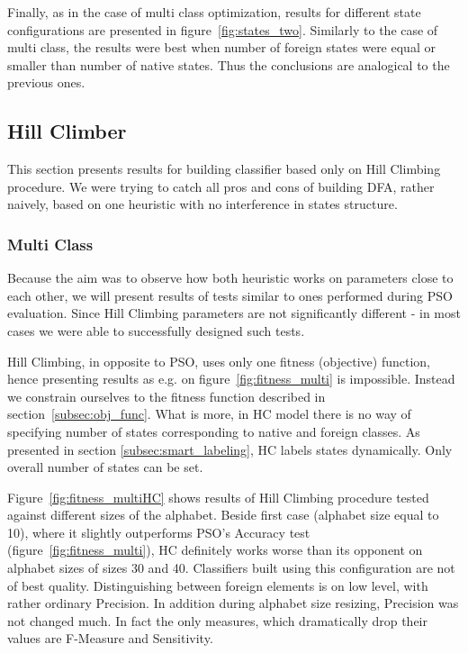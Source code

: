 \documentclass{mini}
\begin{document}
Finally, as in the case of multi class optimization, results for different state configurations are presented in figure~\ref{fig:states_two}. Similarly to the case of multi class, the results were best when number of foreign states were equal or smaller than number of native states. Thus the conclusions are analogical to the previous ones.

\makeFigureFitnessTwo
\makeFigureStatesTwo


\pagebreak
%
%
\subsection{Hill Climber}
This section presents results for building classifier based only on Hill Climbing procedure. We were trying to catch all pros and cons of building DFA, rather naively, based on one heuristic with no interference in states structure. 

\subsubsection{Multi Class} \label{subsec:multi_class_hc}
Because the aim was to observe how both heuristic works on parameters close to each other, we will present results of tests similar to ones performed during PSO evaluation. Since Hill Climbing parameters are not significantly different - in most cases we were able to successfully designed such tests.

Hill Climbing, in opposite to PSO,  uses only one fitness (objective) function, hence presenting results as e.g. on figure~\ref{fig:fitness_multi} is impossible. Instead we constrain ourselves to the fitness function described in section~\ref{subsec:obj_func}. What is more, in HC model there is no way of specifying number of states corresponding to native and foreign classes. As presented in section \ref{subsec:smart_labeling}, HC labels states dynamically. Only overall number of states can be set.  

Figure~\ref{fig:fitness_multiHC} shows results of Hill Climbing procedure tested against different sizes of the alphabet. Beside first case (alphabet size equal to 10), where it slightly outperforms PSO's Accuracy test (figure~\ref{fig:fitness_multi}), HC definitely works worse than its opponent on alphabet sizes of sizes 30 and 40. Classifiers built using this configuration are not of best quality. Distinguishing between foreign elements is on low level, with rather ordinary Precision. In addition during alphabet size resizing, Precision was not changed much. In fact the only measures, which dramatically drop their values are F-Measure and Sensitivity.
\end{document}
